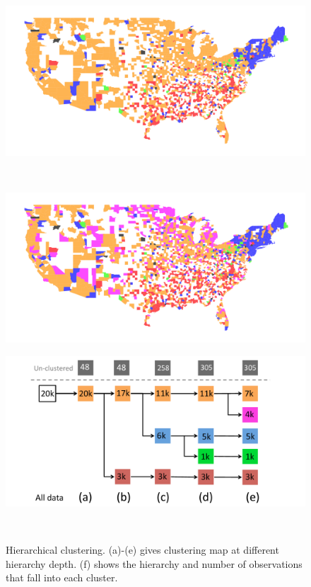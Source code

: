 \begin{figure}
\begin{minipage}[b]{0.5\columnwidth}
    \label{subfig:hierarchy3}
  \end{minipage}
  \begin{minipage}[b]{0.5\columnwidth}
    \centering
    \includegraphics[width=\columnwidth]{fig/hierarchical4.png}
    \label{subfig:hierarchy4}
  \end{minipage}\\
  \begin{minipage}[b]{0.5\columnwidth}
    \centering
    \includegraphics[width=\columnwidth]{fig/hierarchical5.png}
    \label{subfig:hierarchy5}
  \end{minipage}
  \begin{minipage}[b]{0.5\columnwidth}
    \centering
    \includegraphics[width=\columnwidth,height=0.4\columnwidth]{fig/hierarchy.pdf}
    \label{subfig:hierarchy}
  \end{minipage}\\
  \caption{Hierarchical clustering. (a)-(e) gives clustering map at different hierarchy depth. (f) shows the hierarchy and number of observations that fall into each cluster.}
  \label{fig:hierarchy}
\end{figure}

